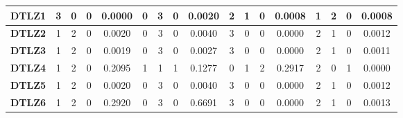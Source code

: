 \begin{table*}[t]
{\begin{tabular}{c|c|c|c|c|c|c|c|c|c|c|c|c|c|c|c|c|}
\multicolumn{1}{|c|}{\textbf{DTLZ1}} & 3                   & 0                     & 0                          & 0.0000          & 0                   & 3                     & 0                          & 0.0020          & 2                   & 1                     & 0                          & 0.0008          & 1                   & 2                     & 0                          & 0.0008          \\ \hline
\multicolumn{1}{|c|}{\textbf{DTLZ2}} & 1                   & 2                     & 0                          & 0.0020          & 0                   & 3                     & 0                          & 0.0040          & 3                   & 0                     & 0                          & 0.0000          & 2                   & 1                     & 0                          & 0.0012          \\ \hline
\multicolumn{1}{|c|}{\textbf{DTLZ3}} & 1                   & 2                     & 0                          & 0.0019          & 0                   & 3                     & 0                          & 0.0027          & 3                   & 0                     & 0                          & 0.0000          & 2                   & 1                     & 0                          & 0.0011          \\ \hline
\multicolumn{1}{|c|}{\textbf{DTLZ4}} & 1                   & 2                     & 0                          & 0.2095          & 1                   & 1                     & 1                          & 0.1277          & 0                   & 1                     & 2                          & 0.2917          & 2                   & 0                     & 1                          & 0.0000          \\ \hline
\multicolumn{1}{|c|}{\textbf{DTLZ5}} & 1                   & 2                     & 0                          & 0.0020          & 0                   & 3                     & 0                          & 0.0040          & 3                   & 0                     & 0                          & 0.0000          & 2                   & 1                     & 0                          & 0.0012          \\ \hline
\multicolumn{1}{|c|}{\textbf{DTLZ6}} & 1                   & 2                     & 0                          & 0.2920          & 0                   & 3                     & 0                          & 0.6691          & 3                   & 0                     & 0                          & 0.0000          & 2                   & 1                     & 0                          & 0.0013          \\ \hline

\end{tabular}}
\end{table*}
